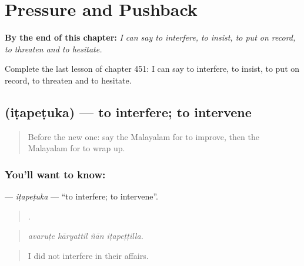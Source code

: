 
\chapter{Pressure and Pushback}
\label{ch:ml-pressure-and-pushback}

\begin{chapteropening}
\textbf{By the end of this chapter:} \emph{I can say to interfere, to insist, to put on record, to threaten and to hesitate.}

Complete the last lesson of chapter 451: I can say to interfere, to insist, to put on record, to threaten and to hesitate.
\end{chapteropening}

\section[\texorpdfstring{\ml{ഇടപെടുക} (iṭapeṭuka)}{ഇടപെടുക (iṭapeṭuka)}]{ (iṭapeṭuka) — to interfere; to intervene}

\label{lesson:ML-C451-itapetuka}



\begin{quote}
Before the new one: say the Malayalam for to improve, then the Malayalam for to wrap up.
\end{quote}

\subsection*{You'll want to know: }
\textbf{} — \emph{iṭapeṭuka} — \textquotedblleft{}to interfere; to intervene\textquotedblright{}.

\begin{quote}
   .
\end{quote}

\begin{quote}
\emph{avaruṭe kāryattil ñān iṭapeṭṭilla.}
\end{quote}

\begin{quote}
I did not interfere in their affairs.
\end{quote}


